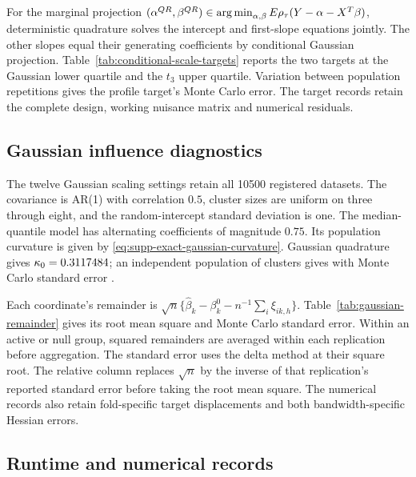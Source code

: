 For the marginal projection
$(\alpha^{QR},\beta^{QR})\in\operatorname*{arg\,min}_{\alpha,\beta}
E\rho_\tau(Y-\alpha-X^T\beta)$,
deterministic quadrature solves the intercept and first-slope
equations jointly. The other slopes equal their generating
coefficients by conditional Gaussian projection.
Table~\ref{tab:conditional-scale-targets} reports the two targets at
the Gaussian lower quartile and the $t_3$ upper quartile. Variation
between population repetitions gives the profile target's Monte Carlo
error. The target records retain the complete design, working
nuisance matrix and numerical residuals.



\subsection{Gaussian influence diagnostics}


The twelve Gaussian scaling settings retain all 10500 registered
datasets. The covariance is AR(1) with correlation $0.5$, cluster
sizes are uniform on three through eight, and the random-intercept
standard deviation is one. The median-quantile model has alternating
coefficients of magnitude $0.75$. Its population curvature is
given by \eqref{eq:supp-exact-gaussian-curvature}. Gaussian
quadrature gives $\kappa_0=0.3117484$; an independent
population of \GaussianCurvatureClusters{} clusters gives
\GaussianCurvaturePopulation{} with Monte Carlo standard error
\GaussianCurvatureMCSE{}.

Each coordinate's remainder is
$\sqrt n\{\widehat\beta_k-\beta_k^0-n^{-1}\sum_i\xi_{ik,h}\}$.
Table~\ref{tab:gaussian-remainder} gives its root mean square and
Monte Carlo standard error. Within an active or null group, squared
remainders are averaged within each replication before aggregation.
The standard error uses the delta method at their square root.
The relative column replaces $\sqrt n$ by the inverse of that
replication's reported standard error before taking the root mean
square. The numerical records also retain fold-specific target
displacements and both bandwidth-specific Hessian errors.

\begingroup\small

\endgroup

\subsection{Runtime and numerical records}

